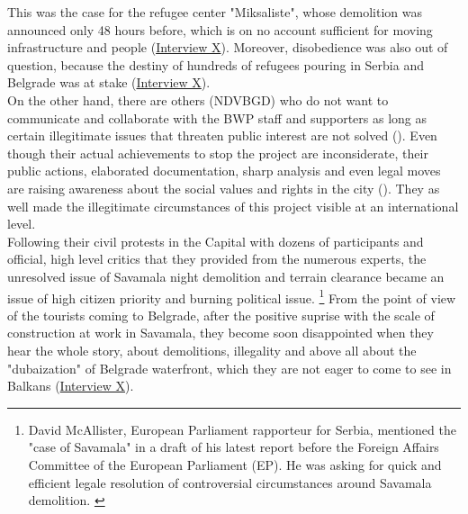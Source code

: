 \documentclass[11pt]{report}
\begin{document}
This was the case for the refugee center "Miksaliste", whose demolition was announced only 48 hours before, which is on no account sufficient for moving infrastructure and people
(\href{InterviewX}{Interview X}).
Moreover, disobedience was also out of question, because  the destiny of hundreds of refugees pouring in Serbia and Belgrade was at stake (\href{InterviewX}{Interview X}).
\\

On the other hand, there are others (NDVBGD) who do not want to communicate and collaborate with the BWP staff and supporters as long as certain illegitimate issues that threaten public interest are not solved (\cite{ref media}).
Even though their actual achievements to stop the project are inconsiderate, their public actions, elaborated documentation, sharp analysis and even legal moves are raising awareness about the social values and rights in the city (\cite{ref media and documents NDVBGD}).
They as well made the illegitimate circumstances of this project visible at an international level.
\\

Following their civil protests in the Capital with dozens of participants and official, high level critics that they provided from the numerous experts, the unresolved issue of Savamala night demolition and terrain clearance became an issue of high citizen priority and burning political issue.
\footnote{David McAllister, European Parliament rapporteur for Serbia, mentioned the "case of Savamala" in a draft of his latest report before the Foreign Affairs Committee of the European Parliament (EP). He was asking for quick and efficient legale resolution of controversial circumstances around Savamala demolition. \cite{Stojanovic2017}}
From the point of view of the tourists coming to Belgrade, after the positive suprise with the scale of construction at work in Savamala, they become soon disappointed when they hear the whole story, about demolitions, illegality and above all about the "dubaization" of Belgrade waterfront, which they are not eager to come to see in Balkans (\href{InterviewX}{Interview X}).
\\
\end{document}
